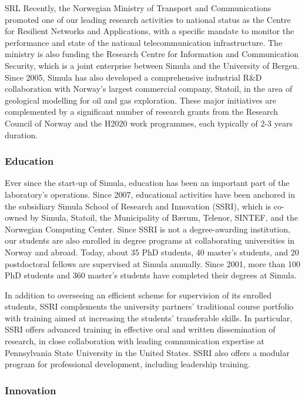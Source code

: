 \begin{sitedescription}{SRL}
Recently, the Norwegian Ministry of Transport and Communications promoted one
of our leading research activities to national status as the Centre for
Resilient Networks and Applications, with a specific mandate to monitor the
performance and state of the national telecommunication infrastructure. The
ministry is also funding the Research Centre for Information and Communication
Security, which is a joint enterprise between Simula and the University of
Bergen. Since 2005, Simula has also developed a comprehensive industrial R\&D
collaboration with Norway’s largest commercial company, Statoil, in the area of
geological modelling for oil and gas exploration. These major initiatives are
complemented by a significant number of research grants from the Research
Council of Norway and the H2020 work programmes, each typically of 2-3 years
duration.

\subsubsection*{Education}

Ever since the start-up of Simula, education has been an important part of the
laboratory’s operations. Since 2007, educational activities have been anchored
in the subsidiary Simula School of Research and Innovation (SSRI), which is
co-owned by Simula, Statoil, the Municipality of Bærum, Telenor, SINTEF, and
the Norwegian Computing Center. Since SSRI is not a degree-awarding
institution, our students are also enrolled in degree programs at collaborating
universities in Norway and abroad. Today, about 35 PhD students, 40 master’s
students, and 20 postdoctoral fellows are supervised at Simula annually. Since
2001, more than 100 PhD students and 360 master’s students have completed their
degrees at Simula.

In addition to overseeing an efficient scheme for supervision of its enrolled
students, SSRI complements the university partners’ traditional course
portfolio with training aimed at increasing the students’ transferable skills.
In particular, SSRI offers advanced training in effective oral and written
dissemination of research, in close collaboration with leading communication
expertise at Pennsylvania State University in the United States. SSRI also
offers a modular program for professional development, including leadership
training.

\subsubsection*{Innovation}


\end{sitedescription}
